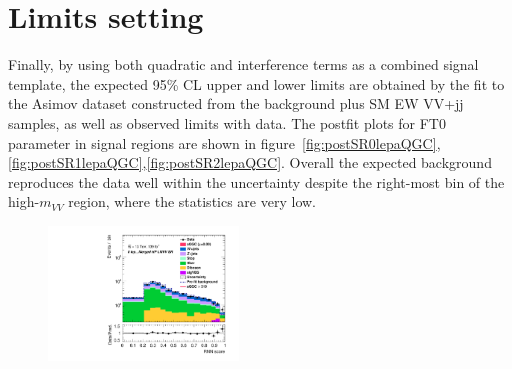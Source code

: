 \section{Limits setting}
Finally, by using both quadratic and interference terms as a combined signal template, the expected 95\% CL upper and lower limits are obtained by the fit to the Asimov dataset constructed from the background plus SM EW VV+jj samples, as well as observed limits with data.
The postfit plots for FT0 parameter in signal regions are shown in figure~\ref{fig:postSR0lepaQGC}, \ref{fig:postSR1lepaQGC},\ref{fig:postSR2lepaQGC}. 
Overall the expected background reproduces the data well within the uncertainty despite the right-most bin of the high-$m_{VV}$ region, where the statistics are very low.
\begin{figure}[]
    \centering
    \includegraphics[width=0.45\textwidth]{figures/aQGC/PostFit/Region_distRNN_DSRVBSHPLMtvvJ1050_BMin0_J0_incJet1_L0_T0_incFat1_Y6051_incTag1_Fat1_GlobalFit_unconditionnal_mu1log}

\end{figure}
